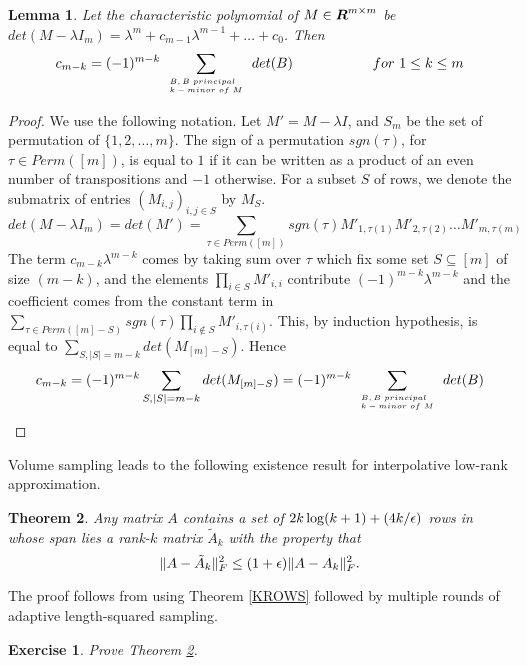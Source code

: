 \documentclass{book}
\newtheorem{theorem}{Theorem}[chapter]
\newtheorem{lemma}[theorem]{Lemma}
\newtheorem{exercise}{Exercise}
\numberwithin{exercise}{chapter}
\begin{document}
\begin{lemma}\label{COEFF}
Let the characteristic polynomial of $M \in \mbox{\mbox{\boldmath $R$}}^{m \times m}$ be
$det(M - \lambda I_m) = \lambda^m + c_{m-1} \lambda^{m-1} + \ldots
+ c_0$. Then \[ c_{m-k} = (-1)^{m-k} \sum_{\tiny \begin{array}{l}
B, B~ principal \\ k-minor~ of~ M \end{array}} det(B) \hspace{2cm}
for~ 1 \leq k \leq m \]
\end{lemma}
\begin{proof}
We use the following notation. Let $M' = M - \lambda I$, and $S_m$
be the set of permutation of $\{ 1, 2, \ldots, m \}$. The sign of
a permutation $sgn(\tau)$, for $\tau \in Perm([m])$, is equal to
$1$ if it can be written as a product of an even number of
transpositions and $-1$ otherwise. For a subset $S$ of rows, we
denote the submatrix of entries $(M_{i,j})_{i,j \in S}$ by $M_S$.
\[ det(M - \lambda I_m) = det(M') = \sum_{\tau \in Perm([m])}
sgn(\tau) M'_{1, \tau(1)} M'_{2, \tau(2)} \ldots M'_{m, \tau(m)}
\] The term $c_{m-k} \lambda^{m-k}$ comes by taking sum over
$\tau$ which fix some set $S \subseteq [m]$ of size $(m-k)$, and
the elements $\prod_{i \in S} M'_{i,i}$ contribute $(-1)^{m-k}
\lambda^{m-k}$ and the coefficient comes from the constant term in
$\sum_{\tau \in Perm([m]-S)} sgn(\tau) \prod_{i \notin S} M'_{i,
\tau(i)}$. This, by induction hypothesis, is equal to $\sum_{S,
|S|=m-k} det(M_{[m]-S})$. Hence
\[ c_{m-k} = (-1)^{m-k} \sum_{S, |S|=m-k} det(M_{[m]-S}) = (-1)^{m-k}
\sum_{\tiny \begin{array}{l} B, B~ principal \\ k-minor~ of~ M
\end{array}} det(B) \]
\end{proof}

Volume sampling leads to the following existence result for interpolative low-rank approximation.
\begin{theorem}\label{EXISTENCE}
Any matrix $A$ contains a set of $2k\log (k+1) + (4k/\epsilon)$ rows in whose span lies a rank-$k$ matrix $\tilde{A}_k$ with the property that
\[
\|A-\tilde{A}_k\|_F^2 \le (1+\epsilon) \|A-A_k\|_F^2.
\]
\end{theorem}
The proof follows from using Theorem \ref{KROWS} followed by multiple rounds of adaptive length-squared sampling.
\begin{exercise}\label{ex:EXISTENCE}
Prove Theorem \ref{EXISTENCE}.
\end{exercise}
\end{document}
